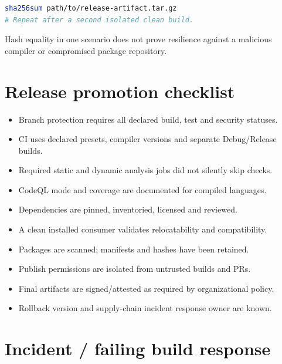 \documentclass[11pt,letterpaper,oneside]{report}
\providecommand{\tightlist}{\setlength{\itemsep}{0pt}\setlength{\parskip}{0pt}}
\begin{document}
\begin{lstlisting}[language=sh]
sha256sum path/to/release-artifact.tar.gz
# Repeat after a second isolated clean build.
\end{lstlisting}

Hash equality in one scenario does not prove resilience against a
malicious compiler or compromised package repository.

\chapter{Release promotion checklist}\label{release-promotion-checklist}

\begin{itemize}
\tightlist
\item[$\square$]
  Branch protection requires all declared build, test and security
  statuses.
\item[$\square$]
  CI uses declared presets, compiler versions and separate Debug/Release
  builds.
\item[$\square$]
  Required static and dynamic analysis jobs did not silently skip
  checks.
\item[$\square$]
  CodeQL mode and coverage are documented for compiled languages.
\item[$\square$]
  Dependencies are pinned, inventoried, licensed and reviewed.
\item[$\square$]
  A clean installed consumer validates relocatability and compatibility.
\item[$\square$]
  Packages are scanned; manifests and hashes have been retained.
\item[$\square$]
  Publish permissions are isolated from untrusted builds and PRs.
\item[$\square$]
  Final artifacts are signed/attested as required by organizational
  policy.
\item[$\square$]
  Rollback version and supply-chain incident response owner are known.
\end{itemize}

\chapter{Incident / failing build
response}\label{incident-failing-build-response}
\end{document}
